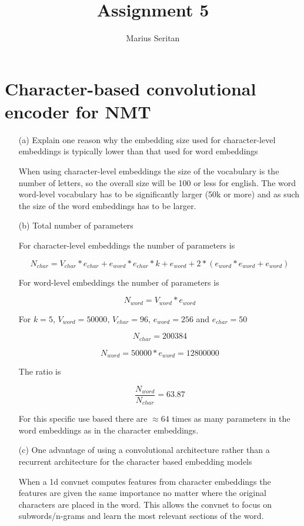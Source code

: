 \documentclass{article}
\begin{document}
\title{Assignment 5}
\author{Marius Seritan}
\maketitle

\section{Character-based convolutional encoder for NMT}

\begin{enumerate}

\item[(a)]{Explain one reason why the embedding size used for character-level embeddings is typically lower than that used for word embeddings}

When using character-level embeddings the size of the vocabulary is the number of letters, so the overall size will be 100 or less for english. The word word-level vocabulary has to be significantly larger (50k or more) and as such the size of the word embeddings has to be larger.
\clearpage

\item[(b)]{Total number of parameters}

For character-level embeddings the number of parameters is 

$$ N_{char} = V_{char} * e_{char} + e_{word} * e_{char} * k + e_{word} + 2 * (e_{word}*e_{word} + e_{word}) $$

For word-level embeddings the number of parameters is

$$ N_{word} = V_{word} * e_{word} $$

For $k = 5$, $V_{word} = 50000$, $V_{char} = 96$, $e_{word}=256$ and $e_{char}=50$

$$ N_{char} =  200384 $$

$$ N_{word} = 50000 * e_{word} = 12800000$$

The ratio is 

$$\frac{N_{word}}{N_{char}} = 63.87$$

For this specific use based there are $\approx 64$ times as many parameters in the word embeddings as in the character embeddings.


\clearpage

\item[(c)]{One advantage of using a convolutional architecture rather than a recurrent architecture for the character based embedding models}

When a 1d convnet computes features from character embeddings the features are given the same importance no matter where the original characters are placed in the word. This allows the convnet to focus on subwords/n-grams and learn the most relevant sections of the word. 


\end{enumerate}
\end{document}
